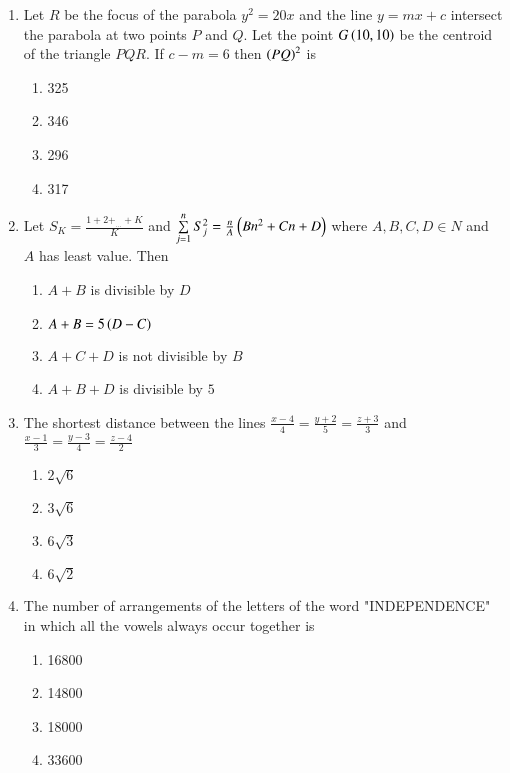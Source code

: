 \documentclass[journal]{IEEEtran}
\begin{document}
\begin{enumerate}
{}
\item{
Let $R$ be the focus of the parabola $y^2=20x$ and the line $y=mx+c$ intersect the parabola at two points $P$ and $Q$. Let the point $G\left(10,10\right)$ be the centroid of the triangle $PQR$. If $c-m=6$ then $\left(PQ\right)^2$ is
\begin{multicols}{4}
\begin{enumerate}
\item 325
\item 346
\item 296
\item 317
\end{enumerate}
\end{multicols}
}
\item{
Let $S_K=\frac{1+2+_{...}+K}{K}$ and $\sum\limits_{j=1}^n S_j^2=\frac{n}{A}\left(Bn^2+Cn+D\right)$ where $A,B,C,D\in N$ and $A$ has least value. Then
\begin{multicols}{2}
\begin{enumerate}
\item $A+B$ is divisible by $D$
\item $A+B=5\left(D-C\right)$
\item $A+C+D$ is not divisible by $B$
\item $A+B+D$ is divisible by $5$
\end{enumerate}
\end{multicols}
}
\item{
The shortest distance between the lines $\frac{x-4}{4}=\frac{y+2}{5}=\frac{z+3}{3}$ and $\frac{x-1}{3}=\frac{y-3}{4}=\frac{z-4}{2}$
\begin{multicols}{4}
\begin{enumerate}
\item $2\sqrt{6}$
\item $3\sqrt{6}$
\item $6\sqrt{3}$
\item $6\sqrt{2}$
\end{enumerate}
\end{multicols}
}
\item{
The number of arrangements of the letters of the word "INDEPENDENCE" in which all the vowels always occur together is
\begin{multicols}{4}
\begin{enumerate}
\item 16800
\item 14800
\item 18000
\item 33600
\end{enumerate}

\end{multicols}}
\end{enumerate}
\end{document}
